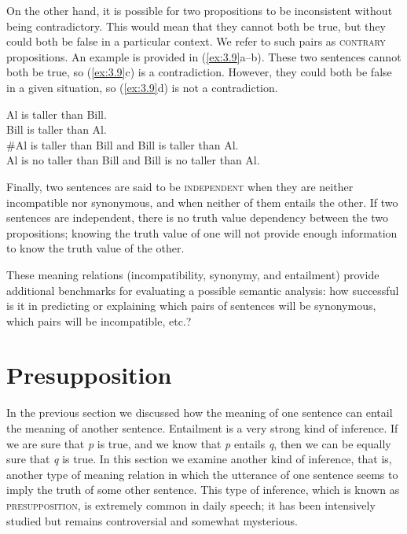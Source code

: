 On the other hand, it is possible for two propositions to be inconsistent without being contradictory. This would mean that they cannot both be true, but they could both be false in a particular context. We refer to such pairs as \textsc{contrary} propositions. An example is provided in (\ref{ex:3.9}a--b). 
These two sentences cannot both be true, so (\ref{ex:3.9}c) is a contradiction. However, they could both be false in a given situation, so (\ref{ex:3.9}d) is not a contradiction.


\ea \label{ex:3.9}
\ea Al is taller than Bill.\\
\ex Bill is taller than Al.\\
\ex \#Al is taller than Bill and Bill is taller than Al.\\
\ex Al is no taller than Bill and Bill is no taller than Al.
                       \z
\z


Finally, two sentences are said to be \textsc{independent} when they are neither incompatible nor synonymous, and when neither of them entails the other. If two sentences are independent, there is no truth value dependency between the two propositions; knowing the truth value of one will not provide enough information to know the truth value of the other.



These meaning relations (incompatibility, synonymy, and entailment) provide additional benchmarks for evaluating a possible semantic analysis: how successful is it in predicting or explaining which pairs of sentences will be synonymous, which pairs will be incompatible, etc.?


\section{Presupposition}\label{sec:3.4}

\largerpage %

In the previous section we discussed how the meaning of one sentence can entail the meaning of another sentence. Entailment is a very strong kind of inference. If we are sure that \textit{p} is true, and we know that \textit{p} entails \textit{q}, then we can be equally sure that \textit{q} is true. In this section we examine another kind of inference, that is, another type of meaning relation in which the utterance of one sentence seems to imply the truth of some other sentence. This type of inference, which is known as \textsc{presupposition}, is extremely common in daily speech; it has been intensively studied but remains controversial and somewhat mysterious.



